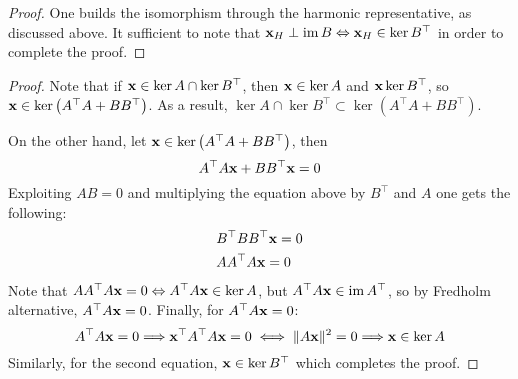 \begin{proof}
      One builds the isomorphism through the harmonic representative, as discussed above. It sufficient to note that \( \mathbf{x}_H \perp \operatorname{im} B \Leftrightarrow \mathbf{x}_H \in \ker B^\top \) in order to complete the proof.
\end{proof}


\begin{proof}
      Note that if \( \mathbf{x} \in \ker A \cap \ker B^\top \), then \( \mathbf{x} \in \ker A \) and \( \mathbf{x} \ker B^\top \), so \( \mathbf{x} \in \ker \left( A^\top A + B B^\top  \right)\). As a result, \( \ker A \cap \ker B^\top \subset \ker \left( A^\top A + B B^\top  \right)\).

      On the other hand, let \( \mathbf{x} \in \ker \left( A^\top A + B B^\top \right)\), then
      \begin{equation}
            A^\top A \mathbf{x}  + B B^\top \mathbf{x} = 0
      \end{equation}
      Exploiting \( A B = 0 \) and multiplying the equation above by \( B^\top \) and \( A \) one gets the following:
      \begin{equation}
            \begin{aligned}
                  & B^\top B B^\top \mathbf{x} = 0 \\
                  & A A^\top A \mathbf{x} = 0 
            \end{aligned}
      \end{equation}
      Note that \( A A^\top A \mathbf{x} = 0 \Leftrightarrow A^\top A \mathbf{x} \in \ker A \), but \( A^\top A \mathbf{x} \in \operatorname{im} A^\top \), so by Fredholm alternative, \( A^\top A \mathbf{x} = 0\). Finally, for \( A^\top A \mathbf{x} = 0\):
      \begin{equation}
             A^\top A \mathbf{x} = 0  \Longrightarrow  \mathbf{x}^\top A^\top A \mathbf{x} = 0 \iff \| A \mathbf{x} \|^2 = 0 \Longrightarrow \mathbf{x} \in \ker A  
      \end{equation}
      Similarly, for the second equation, \( \mathbf{x} \in \ker B^\top \) which completes the proof.
\end{proof}

